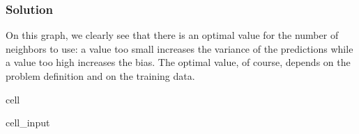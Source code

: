 \documentclass[letterpaper,10pt,english]{jupyterBook}
\begin{document}
\subsubsection{Solution}
\label{\detokenize{03:id3}}
\begin{sphinxShadowBox}
\sphinxstylesidebartitle{}

\sphinxAtStartPar
On this graph, we clearly see that there is an optimal value for the number of neighbors to use: a value too small increases the variance of the predictions while a value too high increases the bias. The optimal value, of course, depends on the problem definition and on the training data.
\end{sphinxShadowBox}

\begin{sphinxuseclass}{cell}\begin{sphinxVerbatimInput}

\begin{sphinxuseclass}{cell_input}
\begin{sphinxVerbatim}[commandchars=\\\{\}]
\PYG{p}{[} \PYG{p}{]}
 
 

 
         


\end{sphinxVerbatim}
\end{sphinxuseclass}
\end{sphinxVerbatimInput}
\end{sphinxuseclass}
\end{document}
